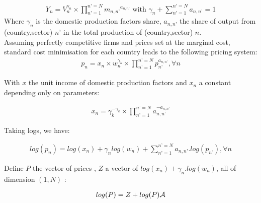 \documentclass[12pt,a4paper]{paper}
\begin{document}
\begin{eqnarray*}
Y_n=V^{\gamma_n}_n \times \prod_{n’=1}^{n’=N} {m_{n,n’}}^{a_{n,n’}} \text{ with } \gamma_n +\sum_{n’=1}^{n’=N} {a_{n,n’}} =1
\end{eqnarray*}
Where $\gamma_n$ is the domestic production factors share, $a_{n,n’}$ the share of output from (country,sector) $n’$ in the total production of (country,sector) $n$. \\ 
Assuming perfectly competitive firms and prices set at the marginal cost, standard cost minimisation for each country leads to the following pricing system:
\begin{eqnarray*}
	p_n=x_n \times w_n^{\gamma_k} \times \prod_{n’=1}^{n’=N}p_{n’}^{a_{n,n’}}, \forall n 
\end{eqnarray*}

With $x$ the unit income of domestic production factors and $x_n$ a constant depending only on parameters:

\begin{eqnarray*}
	x_n=\gamma_k^{-\gamma_k} \times \prod_{n’=1}^{n’=N}a_{n,n’}^{-a_{n,n’}}
\end{eqnarray*}

Taking logs, we have:

\begin{eqnarray*}
	log(p_n) = log(x_n) + \gamma_n log(w_n) + \sum_{n’=1}^{n’=N}a_{n,n’}.log(p_{n’}), \forall n
\end{eqnarray*}

Define $P$ the vector of prices , $Z$ a vector of $log(x_n)+\gamma_n.log(w_n)$, all of dimension $(1,N)$ : 

\begin{eqnarray}
	log(P)=Z + log(P){\cal A}
	\label{eq:priceequation} 
\end{eqnarray}
\end{document}
